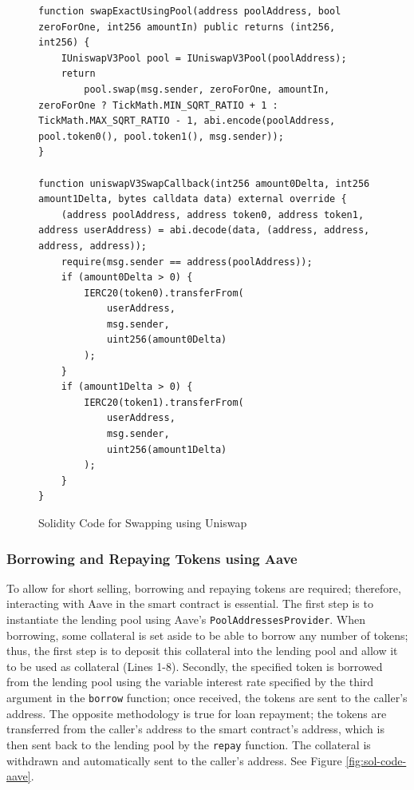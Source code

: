 \begin{figure}[htb!]
\begin{adjustwidth}{-0.5in}{-0.5in}
\begin{minipage}{\linewidth}
\centering
\begin{lstlisting}[language=Solidity]
function swapExactUsingPool(address poolAddress, bool zeroForOne, int256 amountIn) public returns (int256, int256) {
    IUniswapV3Pool pool = IUniswapV3Pool(poolAddress);
    return
        pool.swap(msg.sender, zeroForOne, amountIn, zeroForOne ? TickMath.MIN_SQRT_RATIO + 1 : TickMath.MAX_SQRT_RATIO - 1, abi.encode(poolAddress, pool.token0(), pool.token1(), msg.sender));
}

function uniswapV3SwapCallback(int256 amount0Delta, int256 amount1Delta, bytes calldata data) external override {
    (address poolAddress, address token0, address token1, address userAddress) = abi.decode(data, (address, address, address, address));
    require(msg.sender == address(poolAddress));
    if (amount0Delta > 0) {
        IERC20(token0).transferFrom(
            userAddress,
            msg.sender,
            uint256(amount0Delta)
        );
    }
    if (amount1Delta > 0) {
        IERC20(token1).transferFrom(
            userAddress,
            msg.sender,
            uint256(amount1Delta)
        );
    }
}
\end{lstlisting}
\end{minipage}
\end{adjustwidth}
\caption{Solidity Code for Swapping using Uniswap \label{fig:sol-code-swap}}
\end{figure}

\subsubsection{Borrowing and Repaying Tokens using Aave}
To allow for short selling, borrowing and repaying tokens are required; therefore, interacting with Aave in the smart contract is essential. The first step is to instantiate the lending pool using Aave's \texttt{PoolAddressesProvider}. When borrowing, some collateral is set aside to be able to borrow any number of tokens; thus, the first step is to deposit this collateral into the lending pool and allow it to be used as collateral (Lines 1-8). Secondly, the specified token is borrowed from the lending pool using the variable interest rate specified by the third argument in the \texttt{borrow} function; once received, the tokens are sent to the caller's address. The opposite methodology is true for loan repayment; the tokens are transferred from the caller's address to the smart contract's address, which is then sent back to the lending pool by the \texttt{repay} function. The collateral is withdrawn and automatically sent to the caller's address. See Figure \ref{fig:sol-code-aave}.

